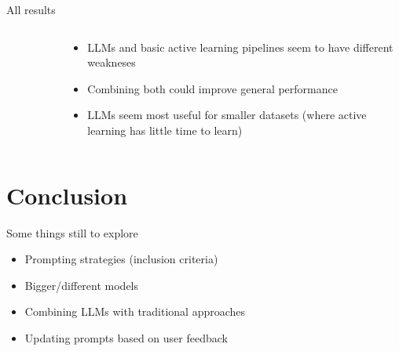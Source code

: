 \documentclass[9pt,aspectratio=169]{beamer}
\begin{document}
\begin{frame}{All results}
	\begin{columns}
	\begin{column}{0.618\linewidth}
		\begin{figure}
			

		\end{figure}
	\end{column}
	\begin{column}{0.382\linewidth}
		\begin{itemize}
			\item<1-> LLMs and basic active learning pipelines seem to have different weakneses
			\item<2-> Combining both could improve general performance
			\item<3-> LLMs seem most useful for smaller datasets (where active learning has little time to learn)
		\end{itemize}
	\end{column}
\end{columns}
\end{frame}

\section{Conclusion}

\begin{frame}{Some things still to explore}
	
\begin{itemize}
	\item<1-> Prompting strategies (inclusion criteria)
	\item<2-> Bigger/different models
	\item<3-> Combining LLMs with traditional approaches
	\item<4-> Updating prompts based on user feedback
\end{itemize}

\end{frame}
\end{document}
